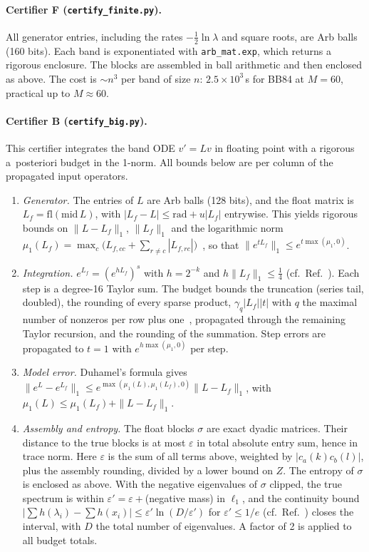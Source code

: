 \documentclass[aps,pra,reprint,superscriptaddress,nofootinbib,longbibliography,floatfix]{revtex4-2}
\theoremstyle{remark}
\begin{document}
\paragraph*{Certifier F (\texttt{certify\_finite.py}).} All generator entries, including the rates
$-\frac12\ln\lambda$ and square roots, are Arb balls (160 bits). Each band is exponentiated with
\texttt{arb\_mat.exp}, which returns a rigorous enclosure. The blocks are assembled in ball arithmetic and
then enclosed as above. The cost is $\sim n^3$ per band of size $n$: $2.5\times10^3$\,s for BB84 at
$M=60$, practical up to $M\approx60$.

\paragraph*{Certifier B (\texttt{certify\_big.py}).} This certifier integrates the band ODE $v'=Lv$ in
floating point with a rigorous a~posteriori budget in the 1-norm. All bounds below are per column of the
propagated input operators.
\begin{enumerate}
\item \emph{Generator.} The entries of $L$ are Arb balls (128 bits), and the float matrix is
$L_f=\mathrm{fl}(\mathrm{mid}\,L)$, with $|L_f-L|\le\mathrm{rad}+u|L_f|$ entrywise. This yields rigorous
bounds on $\|L-L_f\|_1$, $\|L_f\|_1$ and the logarithmic norm
$\mu_1(L_f)=\max_c\bigl(L_{f,cc}+\sum_{r\ne c}|L_{f,rc}|\bigr)$~\cite{soderlind2006lognorm}, so that
$\|e^{tL_f}\|_1\le e^{t\max(\mu_1,0)}$.
\item \emph{Integration.} $e^{L_f}=(e^{hL_f})^s$ with $h=2^{-k}$ and $h\|L_f\|_1\le\frac14$
(cf.\ Ref.~\cite{almohy2011action}). Each step is a degree-16 Taylor sum. The budget bounds the
truncation (series tail, doubled), the rounding of every sparse product, $\gamma_q|L_f||t|$ with $q$ the
maximal number of nonzeros per row plus one~\cite{higham2002accuracy}, propagated through the remaining
Taylor recursion, and the rounding of the summation. Step errors are propagated to $t=1$ with
$e^{h\max(\mu_1,0)}$ per step.
\item \emph{Model error.} Duhamel's formula gives
$\|e^{L}-e^{L_f}\|_1\le e^{\max(\mu_1(L),\mu_1(L_f),0)}\|L-L_f\|_1$, with
$\mu_1(L)\le\mu_1(L_f)+\|L-L_f\|_1$.
\item \emph{Assembly and entropy.} The float blocks $\sigma$ are exact dyadic matrices. Their distance to
the true blocks is at most $\varepsilon$ in total absolute entry sum, hence in trace norm. Here
$\varepsilon$ is the sum of all terms above, weighted by $|c_a(k)c_b(l)|$, plus the assembly rounding,
divided by a lower bound on $Z$. The entropy of $\sigma$ is enclosed as above. With the negative
eigenvalues of $\sigma$ clipped, the true spectrum is within $\varepsilon'=\varepsilon+{}$(negative
mass) in $\ell_1$, and the continuity bound $|\sum h(\lambda_i)-\sum h(x_i)|\le\varepsilon'\ln(D/\varepsilon')$
for $\varepsilon'\le1/e$ (cf.\ Ref.~\cite{fannes1973continuity}) closes the interval, with $D$ the total
number of eigenvalues. A factor of 2 is applied to all budget totals.
\end{enumerate}
\end{document}
